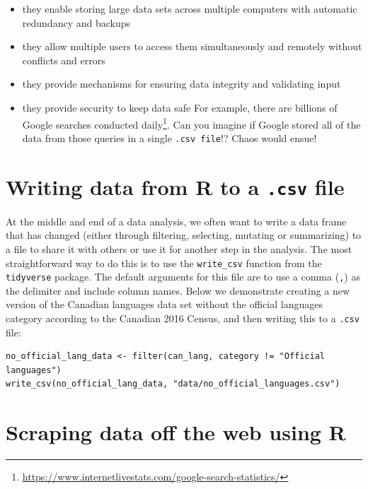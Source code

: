 \documentclass[
]{krantz}
\providecommand{\tightlist}{%
  \setlength{\itemsep}{0pt}\setlength{\parskip}{0pt}}
\renewcommand{\href}[2]{#2\footnote{\url{#1}}}
\begin{document}
\begin{itemize}
\tightlist
\item
  they enable storing large data sets across multiple computers with automatic redundancy and backups
\item
  they allow multiple users to access them simultaneously and remotely without conflicts and errors
\item
  they provide mechanisms for ensuring data integrity and validating input
\item
  they provide security to keep data safe
  For example, \href{https://www.internetlivestats.com/google-search-statistics/}{there are billions of Google searches conducted daily}. Can you imagine if Google stored all of the data from those queries in a single \texttt{.csv\ file}!? Chaos would ensue!
\end{itemize}

\hypertarget{writing-data-from-r-to-a-.csv-file}{%
\section{\texorpdfstring{Writing data from R to a \texttt{.csv} file}{Writing data from R to a .csv file}}\label{writing-data-from-r-to-a-.csv-file}}

At the middle and end of a data analysis, we often want to write a data frame that has changed (either through filtering, selecting, mutating or summarizing) to a file
to share it with others or use it for another step in the analysis. The most straightforward way to do this is to use the \texttt{write\_csv} function from the \texttt{tidyverse} package.
The default arguments for this file are to use a comma (\texttt{,}) as the delimiter and include column names. Below we demonstrate creating a new version of the Canadian languages data set without the official languages category according to the Canadian 2016 Census, and then writing this to a \texttt{.csv} file:

\begin{verbatim}
no_official_lang_data <- filter(can_lang, category != "Official languages")
write_csv(no_official_lang_data, "data/no_official_languages.csv")
\end{verbatim}

\hypertarget{scraping-data-off-the-web-using-r}{%
\section{Scraping data off the web using R}\label{scraping-data-off-the-web-using-r}}
\end{document}

